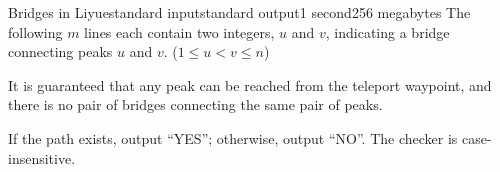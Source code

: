 \begin{problem}{Bridges in Liyue}{standard input}{standard output}{1 second}{256 megabytes}
The following $m$ lines each contain two integers, $u$ and $v$, indicating a bridge connecting peaks $u$ and $v$. ($1 \le u < v \le n$)

It is guaranteed that any peak can be reached from the teleport waypoint, and there is no pair of bridges connecting the same pair of peaks.

\OutputFile
If the path exists, output ``YES''; otherwise, output ``NO''. The checker is case-insensitive.


\Examples

\begin{example}
%
%
%
\end{example}

\end{problem}

